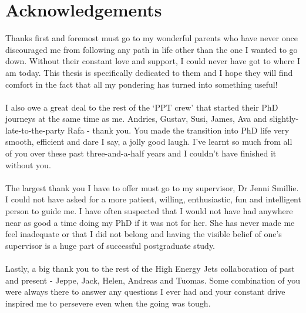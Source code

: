 \chapter{Acknowledgements}

\noindent

\normalsize

Thanks first and foremost must go to my wonderful parents who have never once discouraged me from following any path in life other than the one I wanted to go down. Without their constant love and support, I could never have got to where I am today. This thesis is specifically dedicated to them and I hope they will find comfort in the fact that all my pondering has turned into something useful! \\
\\
I also owe a great deal to the rest of the `PPT crew' that started their PhD journeys at the same time as me. Andries, Gustav, Susi, James, Ava and slightly-late-to-the-party Rafa - thank you. You made the transition into PhD life very smooth, efficient and dare I say, a jolly good laugh. I've learnt so much from all of you over these past three-and-a-half years and I couldn't have finished it without you. \\
\\
The largest thank you I have to offer must go to my supervisor, Dr Jenni Smillie. I could not have asked for a more patient, willing, enthusiastic, fun and intelligent person to guide me. I have often suspected that I would not have had anywhere near as good a time doing my PhD if it was not for her. She has never made me feel inadequate or that I did not belong and having the visible belief of one's supervisor is a huge part of successful postgraduate study. \\
\\
Lastly, a big thank you to the rest of the High Energy Jets collaboration of past and present - Jeppe, Jack, Helen, Andreas and Tuomas. Some combination of you were always there to answer any questions I ever had and your constant drive inspired me to persevere even when the going was tough. 


